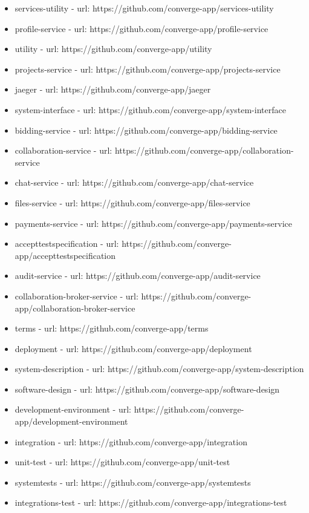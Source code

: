 \begin{itemize}
  \item services-utility - url: https://github.com/converge-app/services-utility
  \item profile-service - url: https://github.com/converge-app/profile-service
  \item utility - url: https://github.com/converge-app/utility
  \item projects-service - url: https://github.com/converge-app/projects-service
  \item jaeger - url: https://github.com/converge-app/jaeger
  \item system-interface - url: https://github.com/converge-app/system-interface
  \item bidding-service - url: https://github.com/converge-app/bidding-service
  \item collaboration-service - url: https://github.com/converge-app/collaboration-service
  \item chat-service - url: https://github.com/converge-app/chat-service
  \item files-service - url: https://github.com/converge-app/files-service
  \item payments-service - url: https://github.com/converge-app/payments-service
  \item accepttestspecification - url: https://github.com/converge-app/accepttestspecification
  \item audit-service - url: https://github.com/converge-app/audit-service
  \item collaboration-broker-service - url: https://github.com/converge-app/collaboration-broker-service
  \item terms - url: https://github.com/converge-app/terms
  \item deployment - url: https://github.com/converge-app/deployment
  \item system-description - url: https://github.com/converge-app/system-description
  \item software-design - url: https://github.com/converge-app/software-design
  \item development-environment - url: https://github.com/converge-app/development-environment
  \item integration - url: https://github.com/converge-app/integration
  \item unit-test - url: https://github.com/converge-app/unit-test
  \item systemtests - url: https://github.com/converge-app/systemtests
  \item integrations-test - url: https://github.com/converge-app/integrations-test

\end{itemize}
